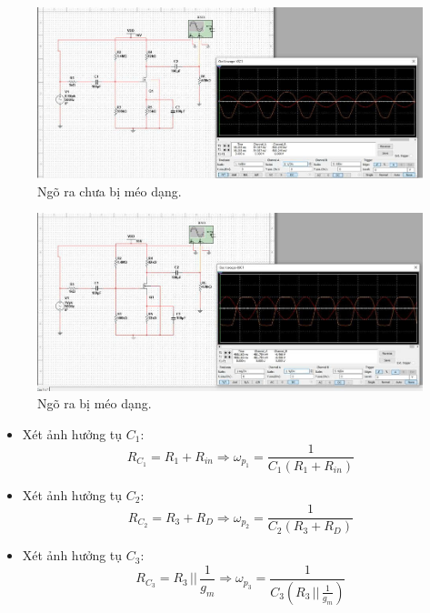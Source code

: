 \begin{figure}[H]
	\centering
	\includegraphics[width=\linewidth]{./my-chapters/my-images/Question1/c_1.jpg}
	\caption{Ngõ ra chưa bị méo dạng.}
\end{figure}
\begin{figure}[H]
	\centering
	\includegraphics[width=\linewidth]{./my-chapters/my-images/Question1/c_2.jpg}
	\caption{Ngõ ra bị méo dạng.}
\end{figure}



\begin{itemize}[label=-]
	\item Xét ảnh hưởng tụ $C_{1}$: 
	\[
	R_{C_{1}}=R_{1}+R_{in}
	\Longrightarrow \omega_{p_{1}}=\frac{1}{C_{1}(R_{1}+R_{in})}
	\]
	
	\item Xét ảnh hưởng tụ $C_{2}$: 
	\[
	R_{C_{2}}=R_{3}+R_{D}
	\Longrightarrow \omega_{p_{2}}=\frac{1}{C_{2}(R_{3}+R_{D})}
	\]
	
	\item Xét ảnh hưởng tụ $C_{3}$: 
	\[
	R_{C_{3}}=R_{3}\,||\,\frac{1}{g_{m}}
	\Longrightarrow \omega_{p_{3}}=\frac{1}{C_{3}\left(R_{3}\,||\,\frac{1}{g_{m}}\right)}
	\]
\end{itemize}

